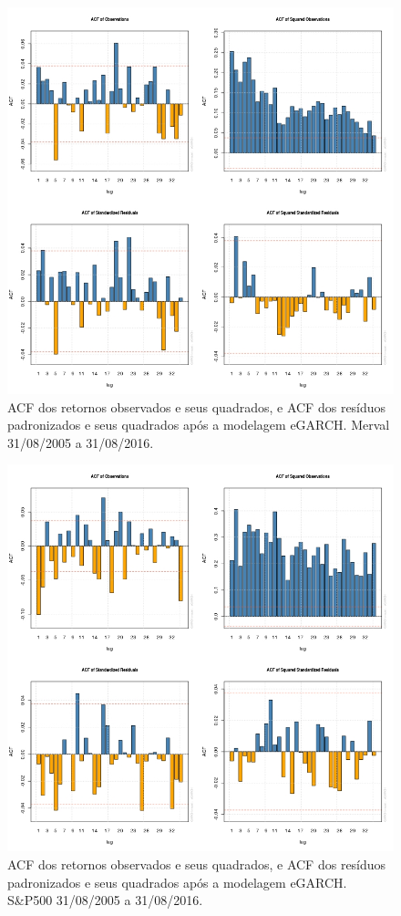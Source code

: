 \documentclass[review]{elsarticle}
\theoremstyle{definition}
\begin{document}
\begin{figure}[H]
	\centering
	\includegraphics[width=0.9\linewidth]{artigo-acf-Merval}
	\caption{ACF dos retornos observados e seus quadrados, e ACF dos resíduos padronizados e seus quadrados após a modelagem eGARCH. Merval 31/08/2005 a 31/08/2016.}
	\label{fig:artigo-acf-merval}
\end{figure}

\begin{figure}[H]
	\centering
	\includegraphics[width=0.9\linewidth]{artigo-acf-SP500}
	\caption{ACF dos retornos observados e seus quadrados, e ACF dos resíduos padronizados e seus quadrados após a modelagem eGARCH. S\&P500 31/08/2005 a 31/08/2016.}
	\label{fig:artigo-acf-sp500}
\end{figure}
\end{document}
